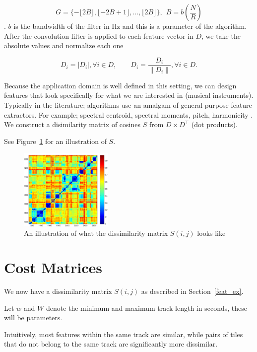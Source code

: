 \documentclass[twocolumn]{article}
\begin{document}
$$G=\{-\lfloor 2B\rfloor,\lfloor-2B+1\rfloor,\ldots, \lfloor 2 B \rfloor\}, \ \  B = b \left( \frac{N}{R} \right)$$. $b$ is the bandwidth of the filter in Hz and this is a parameter of the algorithm. After the convolution filter is applied to each feature vector in $D$, we take the absolute values and normalize each one 

\[
D_i = |D_i|, \forall i \in D, \hspace{2em}
D_i = \frac{D_i}{\|D_i\|}, \forall i \in D.
\]

Because the application domain is well defined in this setting, we can design features that look specifically for what we are interested in (musical instruments). Typically in the literature; algorithms use an amalgam of general purpose feature extractors. For example; spectral centroid, spectral moments, pitch, harmonicity \cite{tzanetakis1999framework}. We construct a disimilarity matrix of cosines $S$ from $D \times D^\top$ (dot products).

See Figure~\ref{fig:simmatrix} for an illustration of $S$.

\begin{figure}[t]
	\centering
	\includegraphics[width=0.4\textwidth]{images/simmat_plain}
	
	\caption{An illustration of what the dissimilarity matrix $S(i,j)$ looks like}
	\label{fig:simmatrix}
\end{figure} 

\section{Cost Matrices}\label{costmatrix_sec} %

We now have a dissimilarity matrix $S(i,j)$ as described in Section~\ref{feat_ex}. 

Let $w$ and $W$ denote the minimum and maximum track length in seconds, these will be parameters.

Intuitively, most features within the same track are similar, while pairs of tiles that do not belong to the same track are significantly more dissimilar. 
\end{document}
